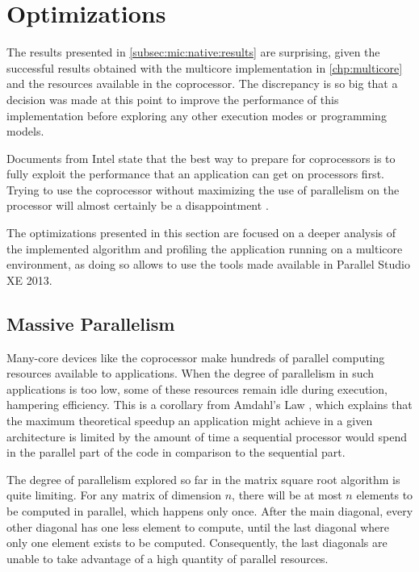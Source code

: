 \documentclass[../thesis]{subfiles}
\begin{document}
	\section{Optimizations}
	\label{sec:mic:optims}

	The results presented in \cref{subsec:mic:native:results} are surprising, given the successful results obtained with the multicore implementation in \cref{chp:multicore} and the resources available in the \intel\xeonphi coprocessor. The discrepancy is so big that a decision was made at this point to improve the performance of this implementation before exploring any other execution modes or programming models.

	Documents from Intel state that the best way to prepare for \intel\xeonphi coprocessors is to fully exploit the performance that an application can get on \intel\xeon processors first. Trying to use the coprocessor without maximizing the use of parallelism on the processor will almost certainly be a disappointment \cite{Intel:MIC:Overview}.

	The optimizations presented in this section are focused on a deeper analysis of the implemented algorithm and profiling the application running on a multicore environment, as doing so allows to use the tools made available in \intel Parallel Studio XE 2013.

	\subsection{Massive Parallelism}
	Many-core devices like the \intel\xeonphi coprocessor make hundreds of parallel computing resources available to applications. When the degree of parallelism in such applications is too low, some of these resources remain idle during execution, hampering efficiency. This is a corollary from Amdahl's Law \cite{Amdahl:1967}, which explains that the maximum theoretical speedup an application might achieve in a given architecture is limited by the amount of time a sequential processor would spend in the parallel part of the code in comparison to the sequential part.

	The degree of parallelism explored so far in the matrix square root algorithm is quite limiting. For any matrix of dimension $n$, there will be at most $n$ elements to be computed in parallel, which happens only once. After the main diagonal, every other diagonal has one less element to compute, until the last diagonal where only one element exists to be computed. Consequently, the last diagonals are unable to take advantage of a high quantity of parallel resources.
\end{document}
